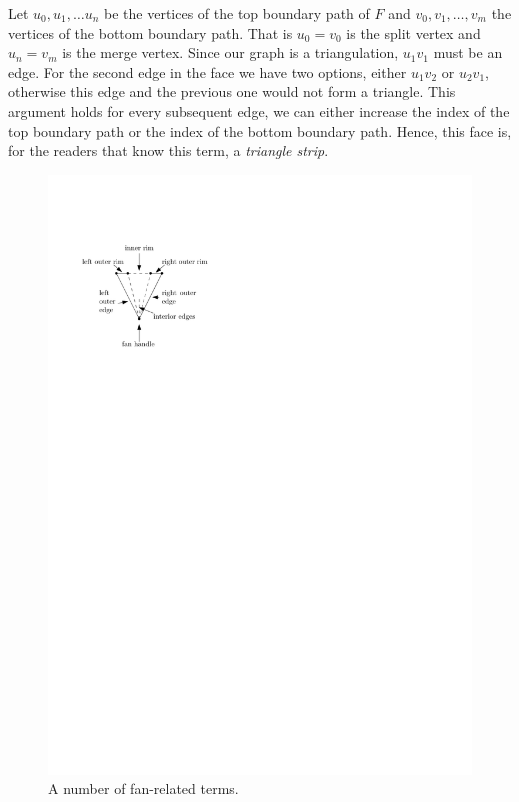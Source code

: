     Let $u_0 , u_1, \ldots u_n$ be the vertices of the top boundary path of $F$ and $v_0, v_1, \ldots, v_m$ the vertices of the bottom boundary path.
    That is $u_0=v_0$ is the split vertex and $u_n = v_m$ is the merge vertex.
    Since our graph is a triangulation, $u_1v_1$ must be an edge.
    For the second edge in the face we have two options, either $u_1v_2$ or $u_2v_1$, otherwise this edge and the previous one would not form a triangle.
    This argument holds for every subsequent edge, we can either increase the index of the top boundary path or the index of the bottom boundary path.
    Hence, this face is, for the readers that know this term, a \emph{triangle strip}.

    \begin{figure}
      \centering
      \includegraphics[scale=1]{rectangularDuals/img/fanterms}
      \caption{A number of fan-related terms.}
      \label{fig:rect:fanTerms}
    \end{figure}

